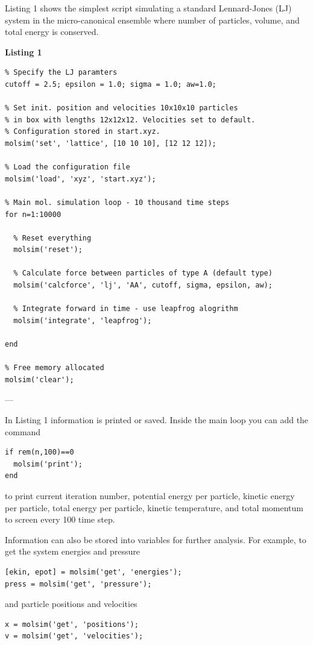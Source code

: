 \documentclass[11pt]{article}
\begin{document}
Listing 1 shows the simplest script simulating a standard Lennard-Jones (LJ)
system in the micro-canonical ensemble where number of particles, volume, and
total energy is conserved. 

\bigskip

\noindent \textbf{Listing 1}
\begin{verbatim}
% Specify the LJ paramters
cutoff = 2.5; epsilon = 1.0; sigma = 1.0; aw=1.0;

% Set init. position and velocities 10x10x10 particles 
% in box with lengths 12x12x12. Velocities set to default. 
% Configuration stored in start.xyz. 
molsim('set', 'lattice', [10 10 10], [12 12 12]);

% Load the configuration file
molsim('load', 'xyz', 'start.xyz');

% Main mol. simulation loop - 10 thousand time steps
for n=1:10000

  % Reset everything
  molsim('reset');

  % Calculate force between particles of type A (default type)
  molsim('calcforce', 'lj', 'AA', cutoff, sigma, epsilon, aw);

  % Integrate forward in time - use leapfrog alogrithm
  molsim('integrate', 'leapfrog');
 
end

% Free memory allocated
molsim('clear');
\end{verbatim}
---

\noindent In Listing 1 information is printed or saved. Inside the main loop you
can add the command
\begin{verbatim}
if rem(n,100)==0
  molsim('print');
end
\end{verbatim}
to print current iteration number, potential energy per particle, kinetic energy
per particle, total energy per particle, kinetic temperature, and total momentum
to screen every 100 time step.

Information can also be stored into variables for further analysis. For example,
to get the system energies and pressure
\begin{verbatim}
[ekin, epot] = molsim('get', 'energies');
press = molsim('get', 'pressure');
\end{verbatim}
and particle positions and velocities
\begin{verbatim}
x = molsim('get', 'positions');
v = molsim('get', 'velocities');
\end{verbatim}
\end{document}
